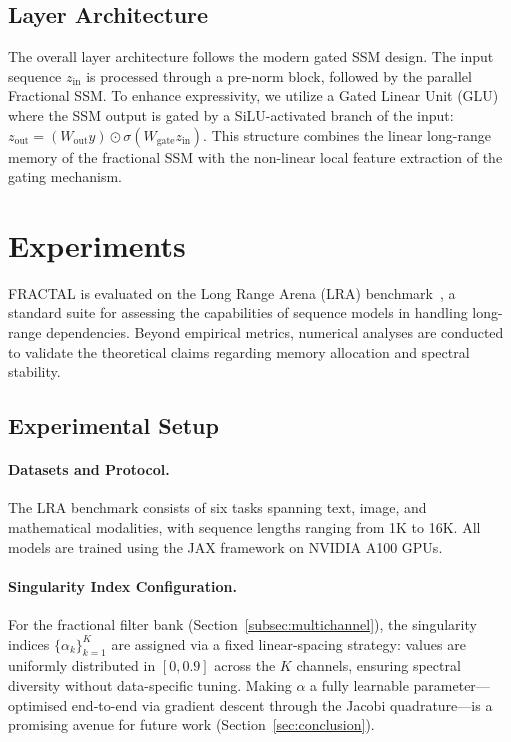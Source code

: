 \documentclass{article}
\theoremstyle{plain}
\theoremstyle{definition}
\theoremstyle{remark}
\begin{document}
\subsection{Layer Architecture}
\label{subsec:layer}

The overall layer architecture follows the modern gated SSM design.
The input sequence $z_{\text{in}}$ is processed through a pre-norm block, followed by the parallel Fractional SSM.
To enhance expressivity, we utilize a Gated Linear Unit (GLU) where the SSM output is gated by a SiLU-activated branch of the input:
$z_{\text{out}} = (W_{\text{out}} y) \odot \sigma(W_{\text{gate}} z_{\text{in}})$.
This structure combines the linear long-range memory of the fractional SSM with the non-linear local feature extraction of the gating mechanism.


\section{Experiments}
\label{sec:experiments}

FRACTAL is evaluated on the Long Range Arena (LRA) benchmark~\citep{tay2021long}, a standard suite for assessing the capabilities of sequence models in handling long-range dependencies. 
Beyond empirical metrics, numerical analyses are conducted to validate the theoretical claims regarding memory allocation and spectral stability.

\subsection{Experimental Setup}
\label{subsec:setup}

\paragraph{Datasets and Protocol.}
The LRA benchmark consists of six tasks spanning text, image, and mathematical modalities, with sequence lengths ranging from 1K to 16K. 
All models are trained using the JAX framework on NVIDIA A100 GPUs.

\paragraph{Singularity Index Configuration.}
For the fractional filter bank (Section~\ref{subsec:multichannel}), the singularity indices $\{\alpha_k\}_{k=1}^{K}$ are assigned via a fixed linear-spacing strategy: values are uniformly distributed in $[0, 0.9]$ across the $K$ channels, ensuring spectral diversity without data-specific tuning.  Making $\alpha$ a fully learnable parameter—optimised end-to-end via gradient descent through the Jacobi quadrature—is a promising avenue for future work (Section~\ref{sec:conclusion}).
\end{document}
